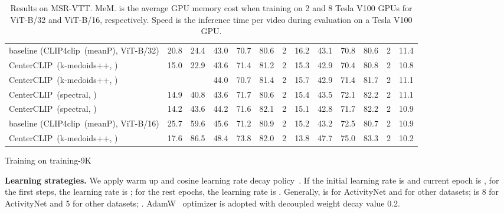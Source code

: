 \documentclass[sigconf]{acmart}
\begin{document}
\begin{table*}[tbp]
\begin{subtable}{1.0\linewidth}
{\begin{tabular}{lcc|ccccc|ccccc}
			baseline (CLIP4clip~(meanP), ViT-B/32)
			& 20.8 & 24.4 
			& 43.0 & 70.7 & 80.6 & {2} & 16.2
			& 43.1 & 70.8 & 80.6 & {2} & 11.4 \\
			
			CenterCLIP~(k-medoids++, )
			& 15.0 & 22.9 
			& 43.6 & {71.4} & 81.2 & 2 & 15.3 
			& 42.9 & 70.4 & 80.8 & {2} & {10.8} \\
			
			CenterCLIP~(k-medoids++, )
			& \cellcolor{Gray}{14.2} & \cellcolor{Gray}{22.9}
			& 44.0 & 70.7 & 81.4 & {2} & 15.7
			& 42.9 & {71.4} & {81.7} & {2} & 11.1  \\

			CenterCLIP~(spectral, )
			& 14.9 & 40.8 
			& 43.6 & {71.7} & {80.6} & {2} & {15.4} 
			& 43.5 & 72.1	& 82.2 & 2 & 11.1 \\

			CenterCLIP~(spectral, )
			& 14.2 & 43.6 
			& 44.2 & 71.6 & 82.1 & 2 & 15.1
			& 42.8 & 71.7 & 82.2 & 2 & 10.9  \\
			\midrule

			baseline (CLIP4clip~(meanP), ViT-B/16)
			& 25.7 & 59.6
			& 45.6 & 71.2 & 80.9 & 2 & 15.2
			& 43.2 & 72.5 & 80.7 & 2 & 10.9 \\			
			
			CenterCLIP~(k-medoids++, )
			& 17.6 & 86.5 
			& \cellcolor{Gray}48.4 & \cellcolor{Gray}73.8 & \cellcolor{Gray}82.0 & \cellcolor{Gray}2 &  \cellcolor{Gray}13.8 
			& \cellcolor{Gray}47.7 & \cellcolor{Gray}75.0 & \cellcolor{Gray}83.3 & \cellcolor{Gray}2 & \cellcolor{Gray}10.2 \\

			\bottomrule
		\end{tabular}
	}
	\caption{Training on \textsf{training-9K}}
	\end{subtable}

	\caption{ Results on MSR-VTT.
	MeM. is the average GPU memory cost when training on 2 and 8 Tesla V100 GPUs for ViT-B/32 and ViT-B/16, respectively.
	Speed is the inference time per video during evaluation on a Tesla V100 GPU. 
	}
	\label{tab:result_MSR-VTT}
\end{table*}



\noindent
\textbf{Learning strategies.}
We apply warm up and
cosine learning rate decay policy~\cite{2017_PriyaGoyal,2018_bags_of_tricks}.
If the initial learning rate is  and current epoch is ,
for the first  steps, the learning rate is 
;
for the rest epochs, the learning rate is
.
Generally,  is  for ActivityNet and   for other datasets;
 is 8 for ActivityNet and 5 for other datasets;
.
AdamW~\cite{loshchilov2018decoupled} optimizer is adopted with
decoupled weight decay value 0.2.
\end{document}
